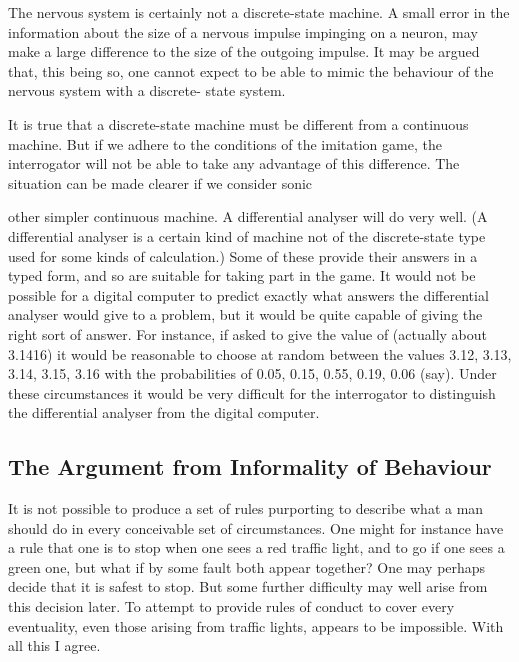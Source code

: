 \documentclass{article}
\begin{document}
The nervous system is certainly not a discrete-state machine. A small error in the information about the size of a nervous impulse impinging on a neuron, may make a large difference to the size of the outgoing impulse. It may be argued that, this being so, one cannot expect to be able to mimic the behaviour of the nervous system with a discrete- state system.

It is true that a discrete-state machine must be different from a continuous machine. But if we adhere to the conditions of the imitation game, the interrogator will not be able to take any advantage of this difference. The situation can be made clearer if we consider sonic

other simpler continuous machine. A differential analyser will do very well. (A differential analyser is a certain kind of machine not of the discrete-state type used for some kinds of calculation.) Some of these provide their answers in a typed form, and so are suitable for taking part in the game. It would not be possible for a digital computer to predict exactly what answers the differential analyser would give to a problem, but it would be quite capable of giving the right sort of answer. For instance, if asked to give the value of (actually about 3.1416) it would be reasonable to choose at random between the values 3.12, 3.13, 3.14, 3.15, 3.16 with the probabilities of 0.05, 0.15, 0.55, 0.19, 0.06 (say). Under these circumstances it would be very difficult for the interrogator to distinguish the differential analyser from the digital computer.


\subsection{The Argument from Informality of Behaviour}

It is not possible to produce a set of rules purporting to describe what a man should do in every conceivable set of circumstances. One might for instance have a rule that one is to stop when one sees a red traffic light, and to go if one sees a green one, but what if by some fault both appear together? One may perhaps decide that it is safest to stop. But some further difficulty may well arise from this decision later. To attempt to provide rules of conduct to cover every eventuality, even those arising from traffic lights, appears to be impossible. With all this I agree.
\end{document}
